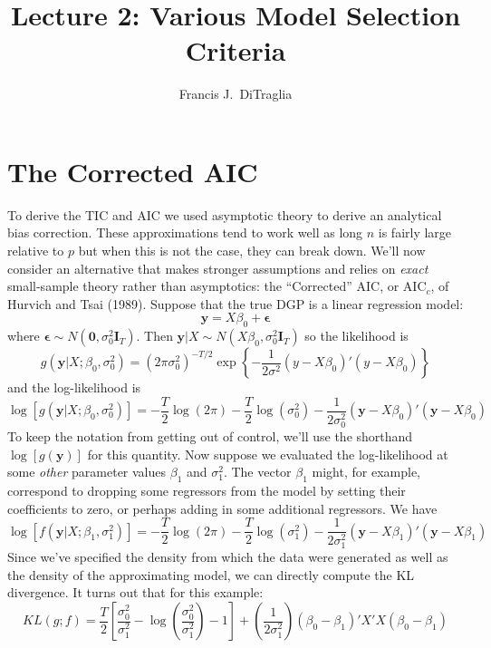 \documentclass[12pt]{article}
\theoremstyle{definition}
\begin{document}
\title{Lecture 2: Various Model Selection Criteria}

\author{Francis J.\ DiTraglia}

\maketitle 




\section{The Corrected AIC}
To derive the TIC and AIC we used asymptotic theory to derive an analytical bias correction. These approximations tend to work well as long $n$ is fairly large relative to $p$ but when this is not the case, they can break down. We'll now consider an alternative that makes stronger assumptions and relies on \emph{exact} small-sample theory rather than asymptotics: the ``Corrected'' AIC, or AIC$
_c$, of Hurvich and Tsai (1989). Suppose that the true DGP is a linear regression model:
$$\textbf{y} = X\beta_0 + \boldsymbol{\epsilon}$$
where $\mathbf{\epsilon} \sim N(\mathbf{0}, \sigma_0^2 \mathbf{I}_T)$. Then $\mathbf{y}|X \sim N(X\beta_0, \sigma_0^2 \mathbf{I}_T)$ so the likelihood is
$$g(\textbf{y}|X;\beta_0, \sigma^2_0) = \left(2\pi\sigma_0^2\right)^{-T/2} \exp\left\{ -\frac{1}{2\sigma^2}(y - X\beta_0)'(y - X\beta_0)\right\}$$
and the log-likelihood is
$$\log\left[g(\textbf{y}|X;\beta_0, \sigma_0^2)\right] = -\frac{T}{2}\log(2\pi) -\frac{T}{2} \log(\sigma^2_0) - \frac{1}{2\sigma_0^2}\left(\textbf{y} - X\beta_0\right)'\left(\textbf{y} -X\beta_0\right)$$
To keep the notation from getting out of control, we'll use the shorthand $\log[g(\mathbf{y})]$ for this quantity. Now suppose we evaluated the log-likelihood at some \emph{other} parameter values $\beta_1$ and $\sigma^2_1$. The vector $\beta_1$ might, for example, correspond to dropping some regressors from the model by setting their coefficients to zero, or perhaps adding in some additional regressors. We have
$$\log[f(\textbf{y}|X;\beta_1, \sigma_1^2)] = -\frac{T}{2}\log(2\pi) -\frac{T}{2} \log(\sigma^2_1) - \frac{1}{2\sigma_1^2}\left(\textbf{y} - X\beta_1\right)'\left(\textbf{y} -X\beta_1\right)$$
Since we've specified the density from which the data were generated as well as the density of the approximating model, we can directly compute the KL divergence. It turns out that for this example:
$$KL(g;f) = \frac{T}{2}\left[\frac{\sigma_0^2}{\sigma_1^2} - \log\left(\frac{\sigma_0^2}{\sigma_1^2}\right) - 1 \right] + \left(\frac{1}{2 \sigma_1^2}\right)\left(\beta_0 - \beta_1\right)'X'X\left(\beta_0 - \beta_1\right)$$
\end{document}
